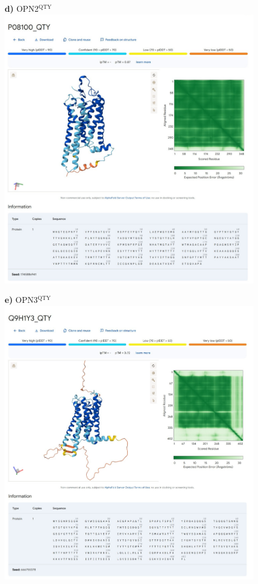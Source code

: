 \documentclass[fleqn,12pt]{supp}
\begin{document}
\newpage
\begin{figure}[H]
    \textbf{d)} OPN2$^{\textrm{QTY}}$ \\
    \includegraphics[width=\linewidth]{FigureS2d.jpg}
\end{figure}

\newpage
\begin{figure}[H]
    \textbf{e)} OPN3$^{\textrm{QTY}}$ \\
    \includegraphics[width=\linewidth]{FigureS2e.jpg}
\end{figure}
\end{document}
